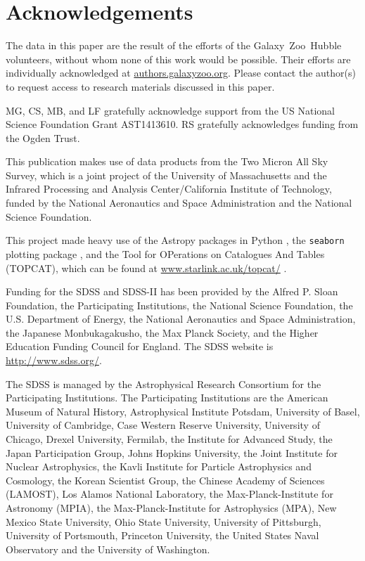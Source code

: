 \documentclass[useAMS,usenatbib]{mn2e}
\begin{document}

\section*{Acknowledgements}
The data in this paper are the result of the efforts of the Galaxy~Zoo~Hubble volunteers, without whom none of this work would be possible. Their efforts are individually acknowledged at \url{authors.galaxyzoo.org}. Please contact the author(s) to request access to research materials discussed in this paper. 


MG, CS, MB, and LF gratefully acknowledge support from the US National
Science Foundation Grant AST1413610. RS gratefully acknowledges funding from the Ogden Trust. 

This publication makes use of data products from the Two Micron All Sky Survey, which is a joint project of the University of Massachusetts and the Infrared Processing and Analysis Center/California Institute of Technology, funded by the National Aeronautics and Space Administration and the National Science Foundation.

This project made heavy use of the Astropy packages in Python \citep{Robitaille2013}, the \texttt{seaborn} plotting package \citep{Waskom}, and the Tool for OPerations on Catalogues And Tables (TOPCAT), which can be found at \url{www.starlink.ac.uk/topcat/} \citep{Taylor2005}. 

Funding for the SDSS and SDSS-II has been provided by the Alfred P. Sloan
Foundation, the Participating Institutions, the National Science Foundation,
the U.S. Department of Energy, the National Aeronautics and Space
Administration, the Japanese Monbukagakusho, the Max Planck Society, and the
Higher Education Funding Council for England. The SDSS website is
\url{http://www.sdss.org/}. 

The SDSS is managed by the Astrophysical Research Consortium for the
Participating Institutions. The Participating Institutions are the American
Museum of Natural History, Astrophysical Institute Potsdam, University of
Basel, University of Cambridge, Case Western Reserve University, University of
Chicago, Drexel University, Fermilab, the Institute for Advanced Study, the
Japan Participation Group, Johns Hopkins University, the Joint Institute for
Nuclear Astrophysics, the Kavli Institute for Particle Astrophysics and
Cosmology, the Korean Scientist Group, the Chinese Academy of Sciences
(LAMOST), Los Alamos National Laboratory, the Max-Planck-Institute for
Astronomy (MPIA), the Max-Planck-Institute for Astrophysics (MPA), New Mexico
State University, Ohio State University, University of Pittsburgh, University
of Portsmouth, Princeton University, the United States Naval Observatory and
the University of Washington. 
\end{document}
